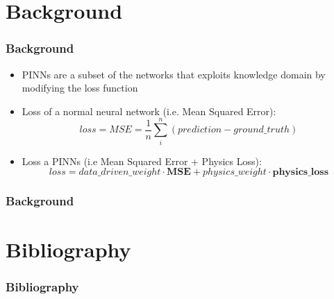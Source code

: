 \documentclass{beamer}
\begin{document}
\section{Background}

\begin{frame}
  \frametitle{Background}
  \begin{itemize}
    \item PINNs are a subset of the networks that exploits knowledge domain by modifying the loss function
    \item Loss of a normal neural network (i.e. Mean Squared Error):
    $$
    loss = MSE = \frac{1}{n} \sum_{i}^{n}(prediction - ground\_truth)
    $$
    \item Loss a PINNs (i.e Mean Squared Error + Physics Loss):
    $$
    loss = data\_driven\_weight \cdot \textbf{MSE} + physics\_weight \cdot \textbf{physics\_loss}
    $$
  \end{itemize}
\end{frame}

\begin{frame}
  \frametitle{Background}

\end{frame}


\section{Bibliography}
\begin{frame}
  \frametitle{Bibliography}
  \printbibliography
\end{frame}
\end{document}
